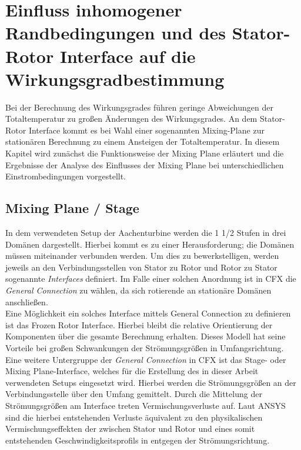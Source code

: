 \chapter{Einfluss inhomogener Randbedingungen und des Stator-Rotor Interface auf die Wirkungsgradbestimmung}
\label{cha:kanal}
Bei der Berechnung des Wirkungsgrades führen geringe Abweichungen der Totaltemperatur zu großen Änderungen des Wirkungsgrades. An dem Stator-Rotor Interface kommt es bei Wahl einer sogenannten Mixing-Plane zur stationären Berechnung zu einem Ansteigen der Totaltemperatur. In diesem Kapitel wird zunächst die Funktionsweise der Mixing Plane erläutert und die Ergebnisse der Analyse des Einflusses der Mixing Plane bei unterschiedlichen Einstrombedingungen vorgestellt.
\section{Mixing Plane / Stage}
In dem verwendeten Setup der Aachenturbine werden die 1 1/2 Stufen in drei Domänen dargestellt. Hierbei kommt es zu einer Herausforderung; die Domänen müssen miteinander verbunden werden. Um dies zu bewerkstelligen, werden jeweils an den Verbindungsstellen von Stator zu Rotor und Rotor zu Stator sogenannte \textit{Interfaces} definiert.
Im Falle einer solchen Anordnung ist in CFX die \textit{General Connection} zu wählen, da sich rotierende an stationäre Domänen anschließen.\\
Eine Möglichkeit ein solches Interface mittels General Connection zu definieren ist das Frozen Rotor Interface. Hierbei bleibt die relative Orientierung der Komponenten über die gesamte Berechnung erhalten. 
Dieses Modell hat seine Vorteile bei großen Schwankungen der Strömungsgrößen in Umfangsrichtung.\\
Eine weitere Untergruppe der \textit{General Connection} in CFX ist das Stage- oder Mixing Plane-Interface, welches für die Erstellung des in dieser Arbeit verwendeten Setups eingesetzt wird. Hierbei werden die Strömungsgrößen an der Verbindungsstelle über den Umfang gemittelt.
Durch die Mittelung der Strömungsgrößen am Interface treten Vermischungsverluste auf. Laut ANSYS sind die hierbei entstehenden Verluste äquivalent zu den physikalischen Vermischungseffekten der zwischen Stator und Rotor und eines somit entstehenden Geschwindigkeitsprofils in entgegen der Strömungsrichtung. \cite{Sharcnet1}

